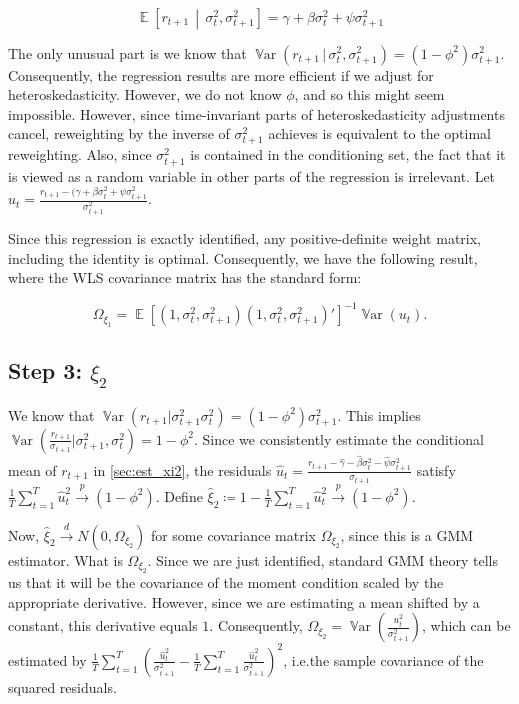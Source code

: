 \documentclass[11pt, letterpaper, twoside, final]{article}
\newcommand*{\dto}{\overset{d}{\longrightarrow}}
\newcommand*{\pto}{\overset{p}{\longrightarrow}}
\newcommand*{\mvert}{\,\middle\vert\,}
\newcommand*{\ivert}{\,\vert\,}
\DeclareMathOperator*{\Var}{\mathbb{V}ar}
\DeclareMathOperator*{\E}{\mathbb{E}}
\begin{document}
\begin{equation}
    \E\left[r_{t+1} \mvert \sigma^2_t, \sigma^2_{t+1}\right]  = \gamma + \beta \sigma^2_t + \psi \sigma^2_{t+1}
\end{equation}

The only unusual part is we know that $\Var(r_{t+1} \ivert \sigma^2_t, \sigma^2_{t+1}) = (1-\phi^2)
\sigma^2_{t+1}$.
Consequently, the regression results  are more efficient if we adjust for heteroskedasticity.
However, we do not know $\phi$, and so this might seem impossible.
However, since time-invariant parts of heteroskedasticity adjustments cancel, reweighting by the inverse of
$\sigma^2_{t+1}$ achieves is equivalent to the optimal reweighting. 
Also, since $\sigma^2_{t+1}$ is contained in the conditioning set, the fact that it is viewed as a random variable
in other parts  of the regression is irrelevant.
Let $u_t = \frac{r_{t+1} - (\gamma + \beta \sigma^2_{t} + \psi \sigma^2_{t+1}}{\sigma^2_{t+1}}$.

Since this regression is exactly identified, any positive-definite weight matrix, including the identity is
optimal.
Consequently, we have the following result, where the WLS covariance matrix has the standard form:

\begin{equation}
    \Omega_{\xi_1} = \E\left[\left(1, \sigma^2_{t}, \sigma^2_{t+1}\right) \left(1, \sigma^2_{t},
    \sigma^2_{t+1}\right)'\right]^{-1} \Var\left(u_t\right).
\end{equation}


\subsection{Step 3: $\xi_2$}

We know that $\Var(r_{t+1} \vert \sigma^2_{t+1} \sigma^2_t) = (1-\phi^2) \sigma^2_{t+1}$.
This implies $\Var(\frac{r_{t+1}}{\sigma_{t+1}} \vert \sigma^2_{t+1}, \sigma^2_t) = 1 - \phi^2$.
Since we consistently estimate the conditional mean of $r_{t+1}$ in \cref{sec:est_xi2}, the residuals
$\widehat{u}_t = \frac{r_{t+1} - \widehat{\gamma} - \widehat{\beta}\sigma^2_t - \widehat{\psi}
\sigma^2_{t+1}}{\sigma_{t+1}}$ satisfy $\frac{1}{T} \sum_{t=1}^T \hat{u}_t^2 \pto (1 - \phi^2)$.
Define $\widehat{\xi}_2 \coloneqq 1 - \frac{1}{T} \sum_{t=1}^T \hat{u}_t^2 \pto (1 - \phi^2)$.

Now, $\widehat{\xi}_2 \dto N(0, \Omega_{\xi_2})$ for some covariance matrix $\Omega_{\xi_2}$, since this is a  GMM
estimator.
What is $\Omega_{\xi_2}$.
Since we are just identified, standard GMM theory tells us that it will be the covariance of the moment condition
scaled by the appropriate derivative. 
However, since we are estimating a mean shifted by a constant, this derivative equals $1$.
Consequently, $\Omega_{\xi_2} = \Var(\frac{u^2_t}{\sigma^2_{t+1}})$, which can be estimated by
$\frac{1}{T} \sum_{t=1}^T (\frac{\widehat{u}_t^2}{\sigma^2_{t+1}} - \frac{1}{T} \sum_{t=1}^T
\frac{\widehat{u}_t^2}{\sigma^2_{t+1}})^2$, i.e.\@ the sample covariance of the squared residuals. 
\end{document}
